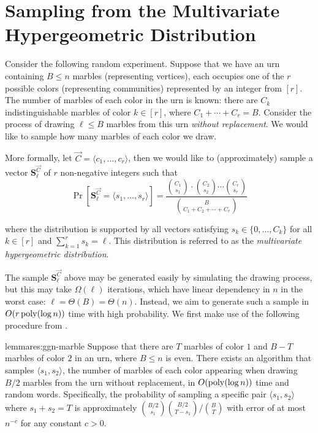 \section{Sampling from the Multivariate Hypergeometric Distribution}
\label{sec:multivariate_hypergeometric_sampling}

Consider the following random experiment. Suppose that we have an urn containing $B \leq n$ marbles (representing vertices), each occupies one of the $r$ possible colors (representing communities) represented by an integer from $[r]$. The number of marbles of each color in the urn is known: there are $C_k$ indistinguishable marbles of color $k \in [r]$, where $C_1 + \cdots + C_r = B$. Consider the process of drawing $\ell \leq B$ marbles from this urn \emph{without replacement}. We would like to sample how many marbles of each color we draw.

More formally, let $\vec{C} = \langle c_1, \ldots, c_r \rangle$, then we would like to (approximately) sample a vector $\mathbf{S}^\vec{C}_\ell$ of $r$ non-negative integers such that
\[\Pr[\mathbf{S}^\vec{C}_\ell = \langle s_1, \ldots, s_r \rangle]
= \frac{{C_1\choose s_1}\cdot{C_2\choose s_2}\cdots{C_r\choose s_r}}{{B \choose C_1+C_2+ \cdots +C_r}}\]

where the distribution is supported by all vectors satisfying $s_k \in \{0, \ldots, C_k\}$ for all $k \in [r]$ and $\sum_{k=1}^{r} s_k = \ell$. This distribution is referred to as the \emph{multivariate hypergeometric distribution}.

The sample $\mathbf{S}^\vec{C}_\ell$ above may be generated easily by simulating the drawing process, but this may take $\Omega(\ell)$ iterations, which have linear dependency in $n$ in the worst case: $\ell = \Theta(B) = \Theta(n)$. Instead, we aim to generate such a sample in $O(r\,\mathrm{poly}(\log n))$ time with high probability. We first make use of the following procedure from \cite{huge}.

\begin{restatable}{lemma}{res:ggn-marble}\label{claim:ggn}
Suppose that there are $T$ marbles of color $1$ and $B-T$ marbles of color $2$ in an urn,
where $B \leq n$ is even. There exists an algorithm that samples $\langle s_1, s_2 \rangle$,
the number of marbles of each color appearing when drawing $B/2$ marbles from the urn without replacement,
in $O(\mathrm{poly}(\log n))$ time and random words.
Specifically, the probability of sampling a specific pair $\langle s_1, s_2 \rangle$ where $s_1 + s_2 = T$
is approximately ${B/2 \choose s_1}{B/2 \choose T-s_1}/{B \choose T}$ with error of at most $n^{-c}$ for any constant $c>0$.
\end{restatable}

